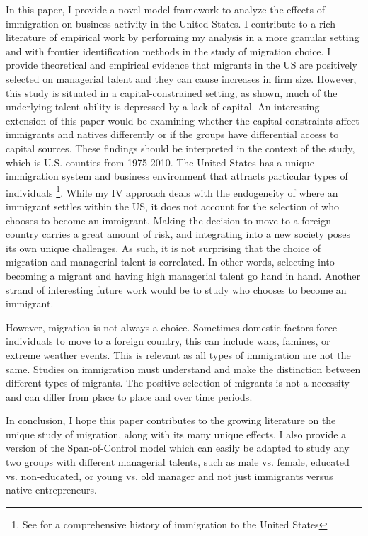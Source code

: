 
In this paper, I provide a novel model framework to analyze the effects of immigration on business activity in the United States. I contribute to a rich literature of empirical work by performing my analysis in a more granular setting and with frontier identification methods in the study of migration choice. I provide theoretical and empirical evidence that migrants in the US are positively selected on managerial talent and they can cause increases in firm size. However, this study is situated in a capital-constrained setting, as shown, much of the underlying talent ability is depressed by a lack of capital. An interesting extension of this paper would be examining whether the capital constraints affect immigrants and natives differently or if the groups have differential access to capital sources. These findings should be interpreted in the context of the study, which is U.S. counties from 1975-2010. The United States has a unique immigration system and business environment that attracts particular types of individuals \footnote{See \cite{ImmigrationinAmericanEconomicHistory} for a comprehensive history of immigration to the United States}. While my IV approach deals with the endogeneity of where an immigrant settles within the US, it does not account for the selection of who chooses to become an immigrant. Making the decision to move to a foreign country carries a great amount of risk, and integrating into a new society poses its own unique challenges. As such, it is not surprising that the choice of migration and managerial talent is correlated. In other words, selecting into becoming a migrant and having high managerial talent go hand in hand. Another strand of interesting future work would be to study who chooses to become an immigrant.

However, migration is not always a choice. Sometimes domestic factors force individuals to move to a foreign country, this can include wars, famines, or extreme weather events. This is relevant as all types of immigration are not the same. Studies on immigration must understand and make the distinction between different types of migrants. The positive selection of migrants is not a necessity and can differ from place to place and over time periods. 

In conclusion, I hope this paper contributes to the growing literature on the unique study of migration, along with its many unique effects. I also provide a version of the Span-of-Control model which can easily be adapted to study any two groups with different managerial talents, such as male vs. female, educated vs. non-educated, or young vs. old manager and not just immigrants versus native entrepreneurs.